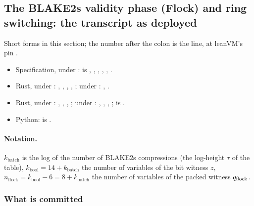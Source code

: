 \subsection{The BLAKE2s validity phase (Flock) and ring switching: the transcript as deployed}\label{sec:gen-flock-ring-transcript}

\begin{sloppypar}
Short forms in this section; the number after the colon is the line, at leanVM's pin
.
\begin{itemize}
\item Specification, under :  is
  ,  , 
  ,  , 
  ,  .
\item Rust, under : , ,
  , , ; under
  : ,
  .
\item Rust, under : , ,
  , ; under : ,
  , , ;
   is .
\item Python:  is .
\end{itemize}
\end{sloppypar}

\paragraph{Notation.} $k_{\mathrm{batch}}$ is the log of the number of BLAKE2s compressions (the
log-height $τ$ of the  table), $k_{\mathrm{bool}} = 14 + k_{\mathrm{batch}}$ the
number of variables of the bit witness $z$, $n_{\mathrm{flock}} = k_{\mathrm{bool}} − 6 = 8 +
k_{\mathrm{batch}}$ the number of variables of the packed witness $q_{\mathrm{flock}}$.

\subsubsection{What is committed}\label{sec:gen-flock-ring-committed}

